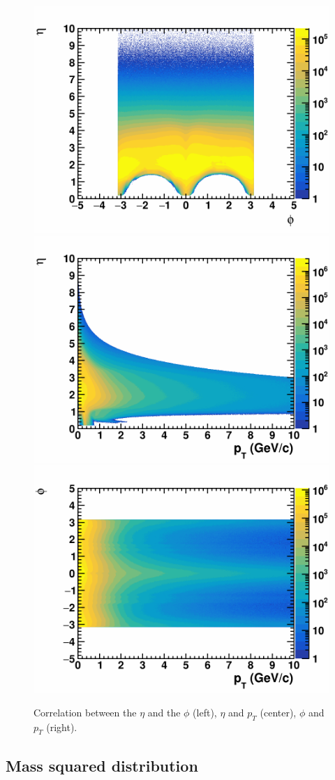     \begin{figure}[H]
        \begin{center}
            \includegraphics[width=0.32\linewidth]{../pict/QA_RunByRun_24.12/H2_NoRuns/cut5_h2_tr_phi_tr_eta.png}
            \includegraphics[width=0.32\linewidth]{../pict/QA_RunByRun_24.12/H2_NoRuns/cut5_h2_tr_pT_tr_eta.png}
            \includegraphics[width=0.32\linewidth]{../pict/QA_RunByRun_24.12/H2_NoRuns/cut5_h2_tr_pT_tr_phi.png}
            \vspace{-3mm}
            \caption{Correlation between the $\eta$ and the $\phi$ (left), $\eta$ and $p_T$ (center), $\phi$ and $p_T$ (right).}
        \end{center}
        \label{nHits_dca}
        \vspace{-5mm}
    \end{figure}




\subsection{Mass squared distribution}\label{m2_qa_sec}

